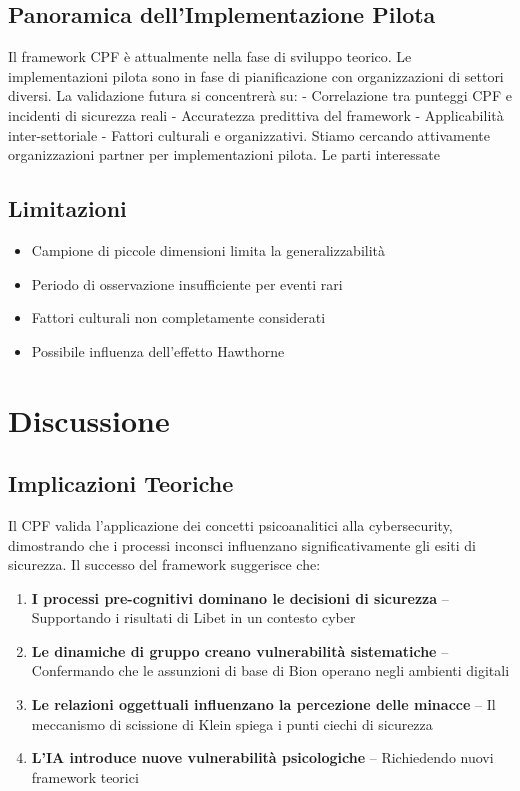 \documentclass[11pt,a4paper]{article}
\begin{document}
\subsection{Panoramica dell'Implementazione Pilota}

Il framework CPF è attualmente nella fase di sviluppo teorico. Le implementazioni pilota sono in fase di pianificazione con organizzazioni di settori diversi. La validazione futura si concentrerà su: - Correlazione tra punteggi CPF e incidenti di sicurezza reali - Accuratezza predittiva del framework - Applicabilità inter-settoriale - Fattori culturali e organizzativi. Stiamo cercando attivamente organizzazioni partner per implementazioni pilota. Le parti interessate \subsection{Limitazioni}

\begin{itemize}
\item Campione di piccole dimensioni limita la generalizzabilità
\item Periodo di osservazione insufficiente per eventi rari
\item Fattori culturali non completamente considerati
\item Possibile influenza dell'effetto Hawthorne
\end{itemize}

\section{Discussione}

\subsection{Implicazioni Teoriche}

Il CPF valida l'applicazione dei concetti psicoanalitici alla cybersecurity, dimostrando che i processi inconsci influenzano significativamente gli esiti di sicurezza. Il successo del framework suggerisce che:

\begin{enumerate}
\item \textbf{I processi pre-cognitivi dominano le decisioni di sicurezza} -- Supportando i risultati di Libet in un contesto cyber
\item \textbf{Le dinamiche di gruppo creano vulnerabilità sistematiche} -- Confermando che le assunzioni di base di Bion operano negli ambienti digitali
\item \textbf{Le relazioni oggettuali influenzano la percezione delle minacce} -- Il meccanismo di scissione di Klein spiega i punti ciechi di sicurezza
\item \textbf{L'IA introduce nuove vulnerabilità psicologiche} -- Richiedendo nuovi framework teorici
\end{enumerate}
\end{document}
